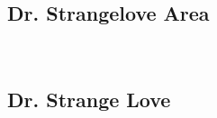 \begin{multicols}{2}
		\section{Dr. Strangelove Area}\label{sa:Dr. Strangelove Area}
	\begin{minipage}{\columnwidth}
	\
	\end{minipage}
	
			\begin{minipage}{\columnwidth}
			\subsection*{Dr. Strange Love}\label{bf:Dr. Strange Love}
			\
			
			\end{minipage}
			
\end{multicols}
\clearpage